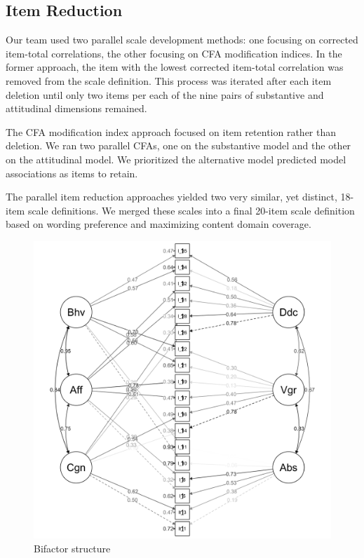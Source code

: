 \documentclass[
]{article}
\begin{document}
\hypertarget{item-reduction}{%
\subsection{Item Reduction}\label{item-reduction}}

Our team used two parallel scale development methods: one focusing on
corrected item-total correlations, the other focusing on CFA
modification indices. In the former approach, the item with the lowest
corrected item-total correlation was removed from the scale definition.
This process was iterated after each item deletion until only two items
per each of the nine pairs of substantive and attitudinal dimensions
remained.

The CFA modification index approach focused on item retention rather
than deletion. We ran two parallel CFAs, one on the substantive model
and the other on the attitudinal model. We prioritized the alternative
model predicted model associations as items to retain.

The parallel item reduction approaches yielded two very similar, yet
distinct, 18-item scale definitions. We merged these scales into a final
20-item scale definition based on wording preference and maximizing
content domain coverage.

\begin{figure}

{\centering \includegraphics[width=0.8\linewidth]{bifactorplot} 

}

\caption{Bifactor structure}\label{fig:bifactorplot}
\end{figure}
\end{document}
